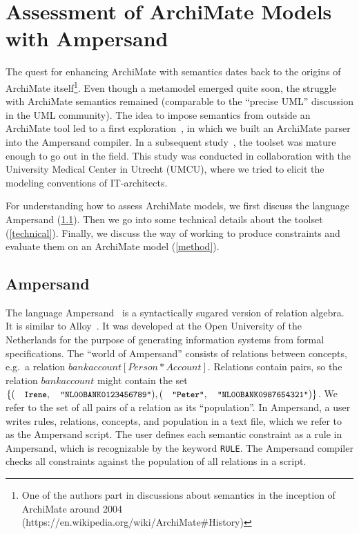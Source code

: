 \documentclass[sn-vancouver]{sn-jnl}%
\begin{document}
\section{Assessment of ArchiMate Models with Ampersand}\label{toolset}
The quest for enhancing ArchiMate with semantics dates back to the origins of ArchiMate itself\footnote{One of the authors part in discussions about semantics in the inception of ArchiMate around 2004 (https://en.wikipedia.org/wiki/ArchiMate\#History)}.
Even though a metamodel emerged quite soon, the struggle with ArchiMate semantics remained (comparable to the ``precise UML'' discussion in the UML community).
The idea to impose semantics from outside an ArchiMate tool led to a first exploration~\cite{filetenterprise},
in which we built an ArchiMate parser into the Ampersand compiler.
In a subsequent study~\cite{iceis22}, the toolset was mature enough to go out in the field.
This study was conducted in collaboration with the University Medical Center in Utrecht (UMCU),
where we tried to elicit the modeling conventions of IT-architects.

For understanding how to assess ArchiMate models, we first discuss the language Ampersand (\ref{Ampersand}).
Then we go into some technical details about the toolset (\ref{technical}).
Finally, we discuss the way of working to produce constraints and evaluate them on an ArchiMate model (\ref{method}).

\subsection{Ampersand}\label{Ampersand}
The language Ampersand~\cite{joosten2018relation} is a syntactically sugared version of relation algebra.
It is similar to Alloy~\cite{Alloy2006}.
It was developed at the Open University of the Netherlands for the purpose of generating information systems from formal specifications.
The ``world of Ampersand'' consists of relations between concepts, e.g.\ a relation $bankaccount[Person*Account]$.
Relations contain pairs, so the relation $bankaccount$ might contain the set $\{(\text{\small\tt Irene},\text{\small\tt "NL00BANK0123456789"}),(\text{\small\tt "Peter"},\text{\small\tt "NL00BANK0987654321"})\}$.
We refer to the set of all pairs of a relation as its ``population''.
In Ampersand, a user writes rules, relations, concepts, and population in a text file, which we refer to as the Ampersand script.
The user defines each semantic constraint as a rule in Ampersand, which is recognizable by the keyword {\small\tt RULE}.
The Ampersand compiler checks all constraints against the population of all relations in a script.
\end{document}
